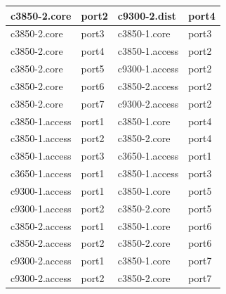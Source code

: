 \begin{longtable}{| l | l | l | l |}
		\hline	
		c3850-2.core & port2 & c9300-2.dist & port4 \\
		\hline
		c3850-2.core & port3 & c3850-1.core & port3 \\
		\hline
		c3850-2.core & port4 & c3850-1.access & port2 \\
		\hline
		c3850-2.core & port5 & c9300-1.access & port2 \\
		\hline
		c3850-2.core & port6 & c3850-2.access & port2 \\
		\hline		
		c3850-2.core & port7 & c9300-2.access & port2 \\
		\hline
		c3850-1.access & port1 & c3850-1.core & port4 \\
		\hline
		c3850-1.access & port2 & c3850-2.core & port4 \\
		\hline
		c3850-1.access & port3 & c3650-1.access & port1 \\
		\hline
		c3650-1.access & port1 & c3850-1.access & port3 \\
		\hline
		c9300-1.access & port1 & c3850-1.core & port5 \\
		\hline
		c9300-1.access & port2 & c3850-2.core & port5 \\
		\hline
		c3850-2.access & port1 & c3850-1.core & port6 \\
		\hline
		c3850-2.access & port2 & c3850-2.core & port6 \\
		\hline
		c9300-2.access & port1 & c3850-1.core & port7 \\
		\hline
		c9300-2.access & port2 & c3850-2.core & port7 \\
		\hline
\end{longtable}